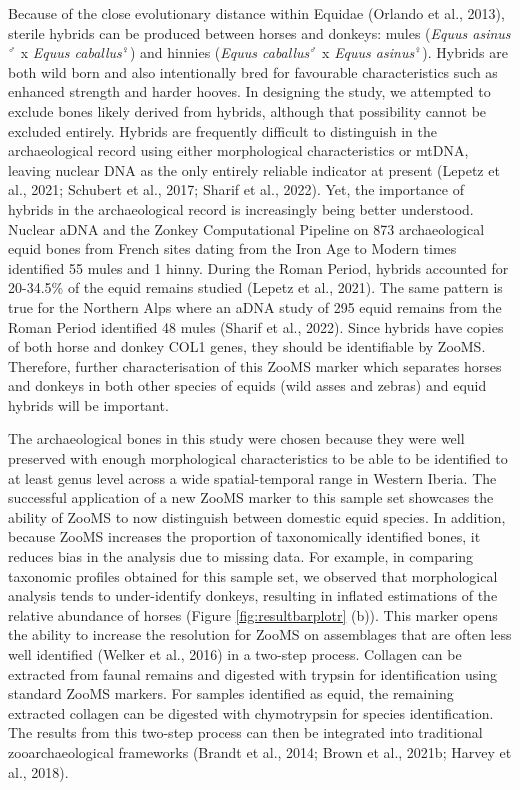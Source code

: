 \documentclass[preprint, 3p, authoryear]{elsarticle} %
\begin{document}
Because of the close evolutionary distance within Equidae (Orlando et al., 2013), sterile hybrids can be produced between horses and donkeys: mules (\emph{Equus asinus}\(^{\male}\) x \emph{Equus caballus}\(^{\female}\)) and hinnies (\emph{Equus caballus}\(^{\male}\) x \emph{Equus asinus}\(^{\female}\)). Hybrids are both wild born and also intentionally bred for favourable characteristics such as enhanced strength and harder hooves. In designing the study, we attempted to exclude bones likely derived from hybrids, although that possibility cannot be excluded entirely. Hybrids are frequently difficult to distinguish in the archaeological record using either morphological characteristics or mtDNA, leaving nuclear DNA as the only entirely reliable indicator at present (Lepetz et al., 2021; Schubert et al., 2017; Sharif et al., 2022). Yet, the importance of hybrids in the archaeological record is increasingly being better understood. Nuclear aDNA and the Zonkey Computational Pipeline on 873 archaeological equid bones from French sites dating from the Iron Age to Modern times identified 55 mules and 1 hinny. During the Roman Period, hybrids accounted for 20-34.5\% of the equid remains studied (Lepetz et al., 2021). The same pattern is true for the Northern Alps where an aDNA study of 295 equid remains from the Roman Period identified 48 mules (Sharif et al., 2022). Since hybrids have copies of both horse and donkey COL1 genes, they should be identifiable by ZooMS. Therefore, further characterisation of this ZooMS marker which separates horses and donkeys in both other species of equids (wild asses and zebras) and equid hybrids will be important.

The archaeological bones in this study were chosen because they were well preserved with enough morphological characteristics to be able to be identified to at least genus level across a wide spatial-temporal range in Western Iberia. The successful application of a new ZooMS marker to this sample set showcases the ability of ZooMS to now distinguish between domestic equid species. In addition, because ZooMS increases the proportion of taxonomically identified bones, it reduces bias in the analysis due to missing data. For example, in comparing taxonomic profiles obtained for this sample set, we observed that morphological analysis tends to under-identify donkeys, resulting in inflated estimations of the relative abundance of horses (Figure \ref{fig:resultbarplotr} (b)). This marker opens the ability to increase the resolution for ZooMS on assemblages that are often less well identified (Welker et al., 2016) in a two-step process. Collagen can be extracted from faunal remains and digested with trypsin for identification using standard ZooMS markers. For samples identified as equid, the remaining extracted collagen can be digested with chymotrypsin for species identification. The results from this two-step process can then be integrated into traditional zooarchaeological frameworks (Brandt et al., 2014; Brown et al., 2021b; Harvey et al., 2018).
\end{document}
